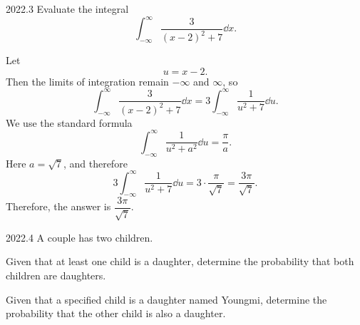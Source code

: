     \begin{pastproblem}{2022.3}
        Evaluate the integral
        \[
            \int_{-\infty}^{\infty}
            \frac{3}{(x-2)^2+7}\dd x.
        \]
    \end{pastproblem}

    \begin{solution}
        Let
        \[
            u=x-2.
        \]
        Then the limits of integration remain $-\infty$ and $\infty$, so
        \[
            \int_{-\infty}^{\infty}
            \frac{3}{(x-2)^2+7}\dd x
            =
            3\int_{-\infty}^{\infty}
            \frac{1}{u^2+7}\dd u.
        \]
        We use the standard formula
        \[
            \int_{-\infty}^{\infty}
            \frac{1}{u^2+a^2}\dd u
            =
            \frac{\pi}{a}.
        \]
        Here $a=\sqrt{7}$, and therefore
        \[
            3\int_{-\infty}^{\infty}
            \frac{1}{u^2+7}\dd u
            =
            3\cdot\frac{\pi}{\sqrt{7}}
            =
            \frac{3\pi}{\sqrt{7}}.
        \]
        Therefore, the answer is $\boxed{\dfrac{3\pi}{\sqrt{7}}}$.
    \end{solution}

    \begin{pastproblem}{2022.4}
        A couple has two children.
        \begin{problemsubparts}
            \item Given that at least one child is a daughter, determine the probability that
                  both children are daughters.
            \item Given that a specified child is a daughter named Youngmi, determine the
                  probability that the other child is also a daughter.
        \end{problemsubparts}
    \end{pastproblem}

